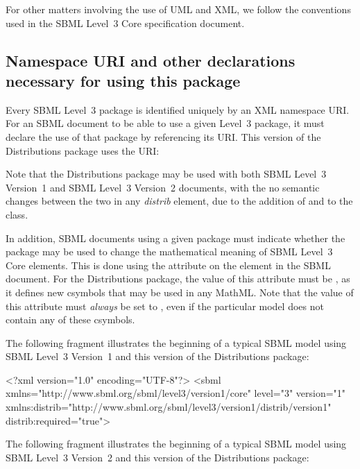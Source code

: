 \documentclass[draftspec]{sbmlpkgspec}
\newcommand{\sbmlthreecore}{SBML Level~3 Core\xspace}
\newcommand{\threeone}{SBML Level~3 Version~1\xspace}
\newcommand{\threetwo}{SBML Level~3 Version~2\xspace}
\newcommand{\DistribBase}{\defRef{DistribBase}{DistribBase-class}}
\newcommand{\distribshort}{\emph{distrib}\xspace}
\newcommand{\distrib}{Distributions\xspace}
\begin{document}
For other matters involving the use of UML and XML, we follow the
conventions used in the SBML Level~3 Core specification document.  


\subsection{Namespace URI and other declarations necessary for using this package}
\label{xml-namespace}

Every SBML Level~3 package is identified uniquely by an XML namespace URI.  For an SBML document to be able to use a given Level~3 package, it must declare the use of that package by referencing its URI.  This version of the \distrib package uses the URI:
\vspace*{-0.5ex}
\begin{center}
\end{center}

Note that the \distrib package may be used with both \threeone and \threetwo documents, with the no semantic changes between the two in any \distribshort element, due to the addition of  and  to the \DistribBase class.

In addition, SBML documents using a given package must indicate whether the package may be used to change the mathematical meaning of \sbmlthreecore elements.  This is done using the attribute  on the  element in the SBML document.  For the \distrib package, the value of this attribute must be , as it defines new csymbols that may be used in any MathML.  Note that the value of this attribute must \emph{always} be set to , even if the particular model does not contain any of these csymbols.

The following fragment illustrates the beginning of a typical SBML model using \threeone and this version of the \distrib package:

\begin{example}
<?xml version="1.0" encoding="UTF-8"?>
<sbml xmlns="http://www.sbml.org/sbml/level3/version1/core" level="3" version="1"
      xmlns:distrib="http://www.sbml.org/sbml/level3/version1/distrib/version1"
      distrib:required="true">
\end{example}


The following fragment illustrates the beginning of a typical SBML model using \threetwo and this version of the \distrib package:
\end{document}
